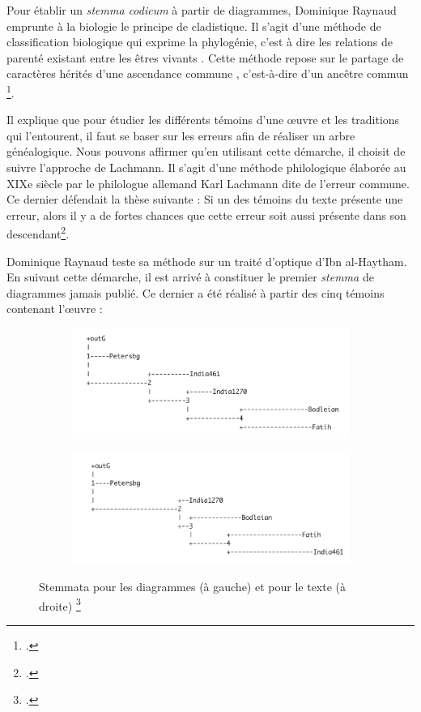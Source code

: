 Pour établir un \textit{stemma codicum} à partir de diagrammes, Dominique Raynaud emprunte à la biologie le principe de cladistique. Il s'agit \og d'une méthode de classification biologique qui exprime la phylogénie, c'est à dire les relations de parenté existant entre les êtres vivants \fg. Cette méthode \og repose sur le partage de caractères hérités d'une ascendance commune \fg, c'est-à-dire d'un \og ancêtre commun \fg \footcite{tassyCLADISTIQUE2012}.

Il explique que pour étudier les différents témoins d'une œuvre et les traditions qui l'entourent, il faut se baser sur les erreurs afin de réaliser un arbre généalogique. Nous pouvons affirmer qu'en utilisant cette démarche, il choisit de suivre l'approche de Lachmann. Il s'agit d'une méthode philologique élaborée au XIXe siècle par le philologue allemand Karl Lachmann dite de l'erreur commune. Ce dernier défendait la thèse suivante : Si un des témoins du texte présente une erreur, alors il y a de fortes chances que cette erreur soit aussi présente dans son descendant\footcite{pouliquenUsingLatticesReconstructing}.

Dominique Raynaud teste sa méthode sur un traité d'optique d'Ibn al-Haytham. En suivant cette démarche, il est arrivé à constituer le premier \textit{stemma} de diagrammes jamais publié. Ce dernier a été réalisé à partir des cinq témoins contenant l'œuvre : 


\begin{figure}[h]
	\centering
	\begin{subfigure}{0.48\linewidth}
		\centering
		\includegraphics[width=\linewidth]{images/diagram_stemma.png}
	\end{subfigure}
	\hfill
	\begin{subfigure}{0.48\linewidth}
		\centering
		\includegraphics[width=\linewidth]{images/text_stemma.png}
	\end{subfigure}
	\caption{Stemmata pour les diagrammes (à gauche) et pour le texte (à droite) \footcite{raynaudBuildingStemmaCodicum2014}}
	\label{fig:stemma}
\end{figure}


